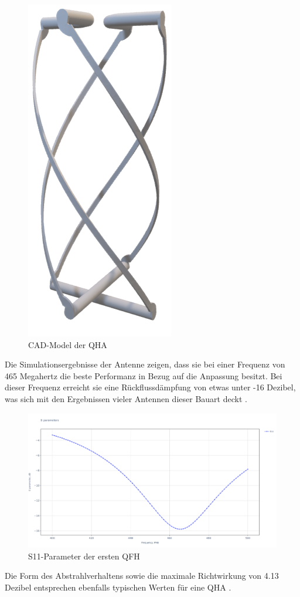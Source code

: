 \begin{figure} [H]
	\centering
	\includegraphics[width=.15\linewidth]{../ref/qfh_render.png}
	\caption{CAD-Model der QHA}
	\label{fig:qfh_render}
\end{figure}

Die Simulationsergebnisse der Antenne zeigen, dass sie bei einer Frequenz von 465 Megahertz die beste Performanz in Bezug auf die Anpassung besitzt. Bei dieser Frequenz erreicht sie eine Rückflussdämpfung von etwas unter -16 Dezibel, was sich mit den Ergebnissen vieler Antennen dieser Bauart deckt \cite{keller_quadrifilar_2015} \cite{noauthor_qfh_nodate}.

\begin{figure} [H]
	\centering
	\includegraphics[width=\linewidth]{../ref/qfh_old_s11.png}
	\caption{S11-Parameter der ersten QFH}
	\label{fig:s11_old_qfh}
\end{figure}

Die Form des Abstrahlverhaltens sowie die maximale Richtwirkung von 4.13 Dezibel entsprechen ebenfalls typischen Werten für eine QHA \cite{keller_quadrifilar_2015}.

